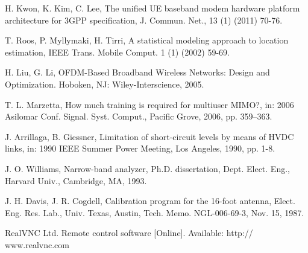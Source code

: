 \documentclass[final,3p,times,twocolumn]{elsarticle}
\begin{document}




% 
% 
% 
% 
% 
% 
% 
% 
% 
% 
% 
% 

\vspace{-0.3cm}

\begin{thebibliography}{1}

 H. Kwon, K. Kim, C. Lee, The unified UE baseband modem hardware platform architecture for 3GPP specification, J. Commun. Net., 13 (1) (2011) 70-76.

 T. Roos, P. Myllymaki, H. Tirri, A statistical modeling approach to location estimation, IEEE Trans. Mobile Comput. 1 (1) (2002) 59-69.

 H. Liu, G. Li, OFDM-Based Broadband Wireless Networks: Design and Optimization. Hoboken, NJ: Wiley-Interscience, 2005.

 T. L. Marzetta, How much training is required for multiuser MIMO?, in: 2006 Asilomar Conf. Signal. Syst. Comput., Pacific Grove, 2006, pp. 359–363.

 J. Arrillaga, B. Giessner, Limitation of short-circuit levels by means of HVDC links, in: 1990 IEEE Summer Power Meeting, Los Angeles, 1990, pp. 1-8.

 J. O. Williams, Narrow-band analyzer, Ph.D. dissertation, Dept. Elect. Eng., Harvard Univ., Cambridge, MA, 1993.

 J. H. Davis, J. R. Cogdell, Calibration program for the 16-foot antenna, Elect. Eng. Res. Lab., Univ. Texas, Austin, Tech. Memo. NGL-006-69-3, Nov. 15, 1987.

 RealVNC Ltd. Remote control software [Online]. Available: http:// www.realvnc.com


\end{thebibliography}
\end{document}
